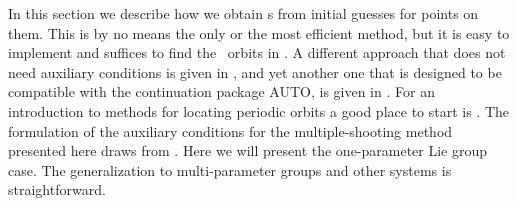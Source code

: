 In this section we describe how we obtain {\rpo s} from
initial guesses for points on them. This is by no means 
the only or the most efficient method, but it is easy
to implement and suffices to find the 
\KS\ orbits in . A different approach
that does not need auxiliary conditions is given in 
, and yet another one that is designed
to be compatible with the continuation package AUTO, 
is given in . For an introduction to
methods for locating periodic orbits a good place to start
is . The formulation of the auxiliary
conditions for the multiple-shooting method
presented here draws from .
Here we will present the one-parameter Lie group case.
The generalization to multi-parameter groups and other systems is straightforward. 


% 
% 

